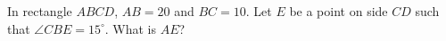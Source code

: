 In rectangle $ABCD$, $AB=20$ and $BC=10$. Let $E$ be a point on side $CD$ such that $\angle CBE=15^\circ$. What is $AE$?
